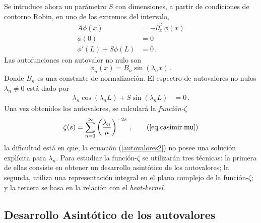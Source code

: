 Se introduce ahora un parámetro $S$ con dimensiones, a partir de condiciones de contorno Robin, en uno de los extremos del intervalo,
\begin{equation}
\begin{aligned}
    A \phi (x) &= - \partial ^2 _x \ \phi (x)  \\[5pt]
    \phi (0) &= 0 \\[5pt]
    \phi ' (L) + S \phi (L) &= 0 \, .
\end{aligned}
\end{equation}
Las autofunciones con autovalor no nulo son
\begin{equation}
\phi _n (x) = 
B _n \sin ( \lambda _n x ) \, .
\end{equation}
Donde $B_n$ es una constante de normalización. El espectro de autovalores no nulos $\lambda _n \neq 0 $ está dado por
\begin{align}
    \lambda _n   \cos( \lambda _n L) +  S \sin( \lambda _n L) &= 0
    \, . \label{autovalores2} 
\end{align}
Una vez obtenidos los autovalores, se calculará la {\it función-$\zeta$}
\begin{equation}
    \zeta (s) =  \sum_{n = 1} ^{ \infty } \left( \frac{\lambda _n}{\mu } \right) ^ {-2 s} \, ,
    \tag{\ref{eq.casimir.mu}}
\end{equation}
la dificultad está en que, la ecuación (\ref{autovalores2}) no posee una solución explícita para $\lambda _n$. Para estudiar la función-$\zeta$ se utilizarán tres técnicas: la primera de ellas consiste en obtener un desarrollo asintótico de los autovalores; la segunda, utiliza una representación integral en el plano complejo de la función-$\zeta$; y la tercera se basa en la relación con el {\it heat-kernel}. 

\subsection{Desarrollo Asintótico de los autovalores}{\label{seq.asin}}

